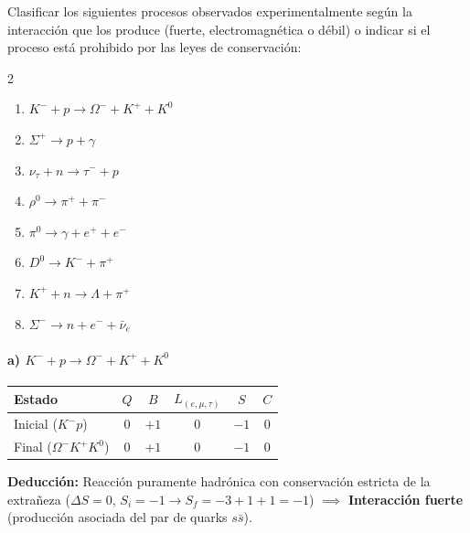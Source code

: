 \newpage
\begin{problema}
Clasificar los siguientes procesos observados experimentalmente según la interacción que los produce (fuerte, electromagnética o débil) o indicar si el proceso está prohibido por las leyes de conservación:

\begin{multicols}{2}
\begin{enumerate}[label=\alph*)]
    \item $K^- + p \rightarrow \Omega^- + K^+ + K^0$
    \item $\Sigma^+ \rightarrow p + \gamma$
    \item $\nu_\tau + n \rightarrow \tau^- + p$
    \item $\rho^0 \rightarrow \pi^+ + \pi^-$
    \item $\pi^0 \rightarrow \gamma + e^+ + e^-$
    \item $D^0 \rightarrow K^- + \pi^+$
    \item $K^+ + n \rightarrow \Lambda + \pi^+$
    \item $\Sigma^- \rightarrow n + e^- + \bar{\nu}_e$
\end{enumerate}
\end{multicols}

\tcblower

\paragraph{a) $K^- + p \rightarrow \Omega^- + K^+ + K^0$}
\begin{center}
\small
\begin{tabular}{lccccc}
\toprule
\textbf{Estado} & $Q$ & $B$ & $L_{(e,\mu,\tau)}$ & $S$ & $C$ \\
\midrule
Inicial ($K^- p$) & $0$ & $+1$ & $0$ & $-1$ & $0$ \\
Final ($\Omega^- K^+ K^0$) & $0$ & $+1$ & $0$ & $-1$ & $0$ \\
\bottomrule
\end{tabular}
\end{center}
\textbf{Deducción:} Reacción puramente hadrónica con conservación estricta de la extrañeza ($\Delta S = 0$, $S_i = -1 \to S_f = -3 + 1 + 1 = -1$) $\implies$ \textbf{Interacción fuerte} (producción asociada del par de quarks $s\bar{s}$).


\end{problema}
